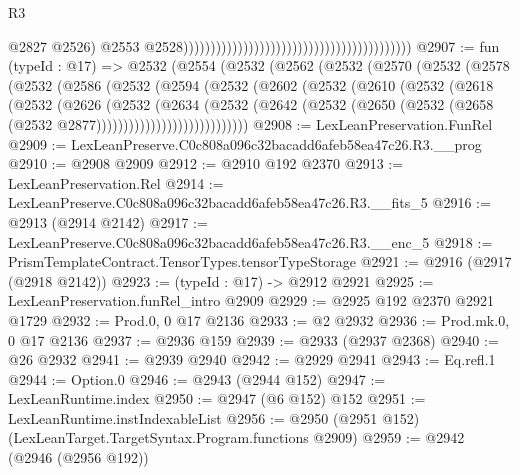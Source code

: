\begin{lexlean}{R3}
\begin{coremodule}
                                                                                          @2827
                                                                                          @2526)
                                                                                        @2553
                                                                                        @2528))))))))))))))))))))))))))))))))))))))))))
@2907 := fun (typeId : @17) =>
  @2532
    (@2554
      (@2532
        (@2562
          (@2532
            (@2570
              (@2532
                (@2578
                  (@2532
                    (@2586
                      (@2532
                        (@2594
                          (@2532
                            (@2602
                              (@2532
                                (@2610
                                  (@2532
                                    (@2618
                                      (@2532
                                        (@2626
                                          (@2532
                                            (@2634
                                              (@2532
                                                (@2642
                                                  (@2532
                                                    (@2650
                                                      (@2532
                                                        (@2658
                                                          (@2532 @2877))))))))))))))))))))))))))))
@2908 := LexLeanPreservation.FunRel
@2909 := LexLeanPreserve.C0c808a096c32bacadd6afeb58ea47c26.R3.__prog
@2910 := @2908 @2909
@2912 := @2910 @192 @2370
@2913 := LexLeanPreservation.Rel
@2914 := LexLeanPreserve.C0c808a096c32bacadd6afeb58ea47c26.R3.__fits_5
@2916 := @2913 (@2914 @2142)
@2917 := LexLeanPreserve.C0c808a096c32bacadd6afeb58ea47c26.R3.__enc_5
@2918 := PrismTemplateContract.TensorTypes.tensorTypeStorage
@2921 := @2916 (@2917 (@2918 @2142))
@2923 := (typeId : @17) -> @2912 @2921
@2925 := LexLeanPreservation.funRel_intro @2909
@2929 := @2925 @192 @2370 @2921 @1729
@2932 := Prod.{0, 0} @17 @2136
@2933 := @2 @2932
@2936 := Prod.mk.{0, 0} @17 @2136
@2937 := @2936 @159
@2939 := @2933 (@2937 @2368)
@2940 := @26 @2932
@2941 := @2939 @2940
@2942 := @2929 @2941
@2943 := Eq.refl.{1}
@2944 := Option.{0}
@2946 := @2943 (@2944 @152)
@2947 := LexLeanRuntime.index
@2950 := @2947 (@6 @152) @152
@2951 := LexLeanRuntime.instIndexableList
@2956 := @2950 (@2951 @152) (LexLeanTarget.TargetSyntax.Program.functions @2909)
@2959 := @2942 (@2946 (@2956 @192))

\end{coremodule}
\end{lexlean}
